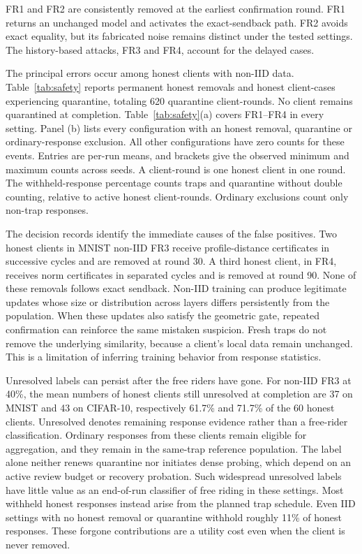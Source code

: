 \documentclass[conference]{IEEEtran}
\makeatletter
\renewcommand{\subsection}{\@startsection{subsection}{2}{\z@}{1.5ex}{0.7ex}{\normalfont\normalsize\itshape}}
\makeatother
\begin{document}
FR1 and FR2 are consistently removed at the earliest confirmation round.
FR1 returns an unchanged model and activates the exact-sendback path.
FR2 avoids exact equality, but its fabricated noise remains distinct
under the tested settings. The history-based attacks, FR3 and FR4,
account for the delayed cases.


\subsection{Honest-Client Impact}
The principal errors occur among honest clients with non-IID data.
Table~\ref{tab:safety} reports \MultiFP{} permanent honest removals and
\MultiQuarantined{} honest client-cases experiencing quarantine, totaling
620 quarantine client-rounds. No client remains quarantined at completion.
Table~\ref{tab:safety}(a) covers FR1--FR4 in every setting.
Panel (b) lists every configuration with an honest removal, quarantine
or ordinary-response exclusion. All other configurations have zero
counts for these events. Entries are per-run means, and brackets give
the observed minimum and maximum counts across seeds. A client-round
is one honest client in one round. The withheld-response percentage
counts traps and quarantine without double counting, relative to active
honest client-rounds. Ordinary exclusions count only non-trap responses.

The decision records identify the immediate causes of the false positives.
Two honest clients in MNIST non-IID FR3 receive profile-distance
certificates in successive cycles and are removed at round 30. A third
honest client, in FR4, receives norm certificates in separated cycles
and is removed at round 90. None of these removals follows exact sendback.
Non-IID training can produce legitimate updates whose size or distribution
across layers differs persistently from the population. When these updates
also satisfy the geometric gate, repeated confirmation can reinforce the
same mistaken suspicion. Fresh traps do not remove the underlying
similarity, because a client's local data remain unchanged. This is a
limitation of inferring training behavior from response statistics.

Unresolved labels can persist after the free riders have gone.
For non-IID FR3 at 40\%, the mean numbers of honest clients still
unresolved at completion are 37 on MNIST and 43 on CIFAR-10, respectively
61.7\% and 71.7\% of the 60 honest clients. Unresolved denotes remaining
response evidence rather than a free-rider classification.
Ordinary responses from these clients remain
eligible for aggregation, and they remain in the same-trap reference
population. The label alone neither renews quarantine nor initiates dense
probing, which depend on an active review budget or recovery probation.
Such widespread unresolved labels have little value as an end-of-run
classifier of free riding in these settings.
Most withheld honest responses instead arise from the planned trap
schedule. Even IID settings with no honest removal or quarantine withhold
roughly 11\% of honest responses. These forgone contributions are a
utility cost even when the client is never removed.

\end{document}
